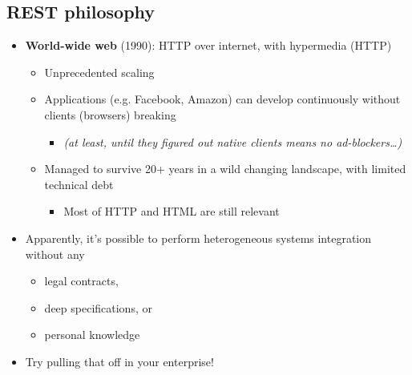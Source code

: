 \documentclass[8pt]{article}
\begin{document}
\subsection{REST philosophy}
\label{sec:org494782c}
\begin{itemize}
\item \textbf{World-wide web} (1990): HTTP over internet, with hypermedia (HTTP)
\begin{itemize}
\item Unprecedented scaling
\item Applications (e.g. Facebook, Amazon) can develop continuously without clients (browsers) breaking
\begin{itemize}
\item \emph{(at least, until they figured out native clients means no ad-blockers\ldots{})}
\end{itemize}
\item Managed to survive 20+ years in a wild changing landscape, with limited technical debt
\begin{itemize}
\item Most of HTTP and HTML are still relevant
\end{itemize}
\end{itemize}
\item Apparently, it's possible to perform heterogeneous systems integration without any
\begin{itemize}
\item legal contracts,
\item deep specifications, or
\item personal knowledge
\end{itemize}

\item Try pulling that off in your enterprise!
\end{itemize}
\end{document}
